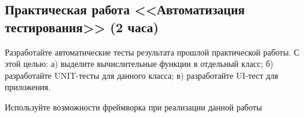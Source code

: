 \subsection{Практическая работа <<Автоматизация тестирования>> (2 часа)}

Разработайте автоматические тесты результата прошлой практической работы. С этой целью: а) выделите вычислительные функции в отдельный класс;
б) разработайте UNIT-тесты для данного класса; в) разработайте UI-тест для приложения.

Используйте возможности фреймворка при реализации данной работы

